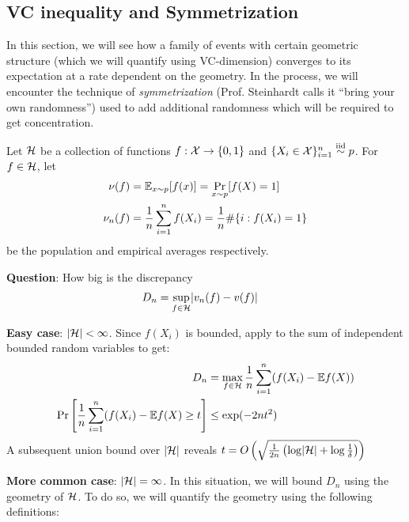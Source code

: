 \subsection{VC inequality and Symmetrization}

In this section, we will see how a family of events with certain geometric structure (which we will
quantify using VC-dimension) converges to its expectation at a rate dependent on the geometry.
In the process, we will encounter the technique of \emph{symmetrization}
(Prof. Steinhardt calls it ``bring your own randomness'') used to add additional randomness which
will be required to get concentration.

Let $\mathcal{H}$ be a collection of functions $f : \mathcal{X} \to \{0,1\}$ and $\{X_i \in \mathcal{X}\}_{i=1}^n \overset{\text{iid}}{\sim} p$.
For $f \in \mathcal{H}$, let
\begin{align}
    \nu(f) &= \mathbb{E}_{x \sim p}[ f(x)] = \Pr_{x \sim p}[f(X) = 1] \\
    \nu_n(f) &= \frac{1}{n} \sum_{i=1}^n f(X_i) = \frac{1}{n} \#\{i : f(X_i) = 1\}
\end{align}
be the population and empirical averages respectively.

\textbf{Question}: How big is the discrepancy
\begin{align}
    D_n &= \sup_{f \in \mathcal{H}} \lvert v_n(f) - v(f) \rvert
\end{align}

\textbf{Easy case}: $\lvert \mathcal{H} \rvert < \infty$. Since $f(X_i)$ is bounded, apply 
to the sum of independent bounded random variables to get:
\begin{align}
    D_n &= \max_{f \in \mathcal{H}} \frac{1}{n} \sum_{i=1}^n (f(X_i) - \mathbb{E} f(X)) \\
    \Pr\left[\frac{1}{n} \sum_{i=1}^n (f(X_i) - \mathbb{E} f(X) \geq t \right] &\leq \exp(-2 n t^2)
\end{align}
A subsequent union bound over $\lvert \mathcal{H} \rvert$ reveals
$t = O\left(\sqrt{\frac{1}{2n} \left( \log \lvert \mathcal{H} \rvert + \log \frac{1}{\delta} \right)}\right)$

\textbf{More common case}: $\lvert \mathcal{H} \rvert = \infty$. 
In this situation, we will bound $D_n$ using the geometry of $\mathcal{H}$.
To do so, we will quantify the geometry using the following definitions:


